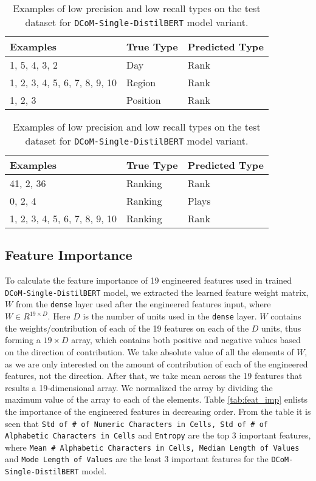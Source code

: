 \documentclass{article}
\begin{document}
\begin{table}
	\centering
	\begin{adjustbox}{center}
		\begin{tabular}{lll}
			\hline
			\textbf{Examples} & \textbf{True Type} & \textbf{Predicted Type}\\
			\hline
			1, 5, 4, 3, 2 & Day & Rank\\
			1, 2, 3, 4, 5, 6, 7, 8, 9, 10  & Region & Rank \\
			1, 2, 3 & Position & Rank \\
			\hline
		\end{tabular} 
	\end{adjustbox}
	\caption*{(a) Low Precision}
	
	
	\begin{adjustbox}{center}
		\begin{tabular}{lll}
			\hline
			\textbf{Examples} & \textbf{True Type} & \textbf{Predicted Type}\\
			\hline
			41, 2, 36 & Ranking & Rank\\
			0, 2, 4  & Ranking & Plays \\
			1, 2, 3, 4, 5, 6, 7, 8, 9, 10 & Ranking & Rank \\
			\hline
		\end{tabular}
	\end{adjustbox}
	\caption*{(a) Low Recall}
	\caption{Examples of low precision and low recall types on the test dataset for \texttt{DCoM-Single-DistilBERT} model variant.}
	\label{tab:low_recall_precision}
\end{table}

\subsection{Feature Importance}
To calculate the feature importance of 19 engineered features used in trained \texttt{DCoM-Single-DistilBERT} model, we extracted the learned feature weight matrix, $W$ from the \texttt{dense} layer used after the engineered features input, where $W \in R^{19 \times D}$. Here $D$ is the number of units used in the \texttt{dense} layer. $W$ contains the weights/contribution of each of the 19 features on each of the $D$ units, thus forming a $19 \times D$ array, which contains both positive and negative values based on the direction of contribution. We take absolute value of all the elements of $W$, as we are only interested on the amount of contribution of each of the engineered features, not the direction. After that, we take mean across the 19 features that results a 19-dimensional array. We normalized the array by dividing the maximum value of the array to each of the elements. Table \ref{tab:feat_imp} enlists the importance of the engineered features in decreasing order. From the table it is seen that \texttt{Std of \# of   Numeric Characters in Cells, Std of \# of   Alphabetic Characters in Cells} and \texttt{Entropy} are the top 3 important features, where \texttt{Mean \# Alphabetic   Characters in Cells, Median Length of   Values} and \texttt{Mode Length of   Values} are the least 3 important features for the \texttt{DCoM-Single-DistilBERT} model.
\end{document}
